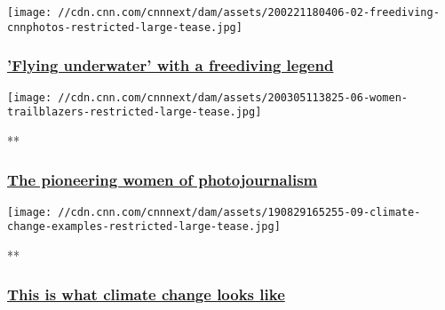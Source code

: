 \href{https://www.cnn.com/interactive/2020/02/world/freediving-guillaume-nery-cnnphotos/index.html}{}

\texttt{[image: //cdn.cnn.com/cnnnext/dam/assets/200221180406-02-freediving-cnnphotos-restricted-large-tease.jpg]}

\hypertarget{flying-underwater-with-a-freediving-legend}{%
\subsubsection{\texorpdfstring{\href{https://www.cnn.com/interactive/2020/02/world/freediving-guillaume-nery-cnnphotos/index.html}{'Flying
underwater' with a freediving
legend}}{'Flying underwater' with a freediving legend}}\label{flying-underwater-with-a-freediving-legend}}

\href{/2020/03/06/world/gallery/trailblazers-of-light-women-photojournalists/index.html}{}

\texttt{[image: //cdn.cnn.com/cnnnext/dam/assets/200305113825-06-women-trailblazers-restricted-large-tease.jpg]}

**

\hypertarget{the-pioneering-women-of-photojournalism}{%
\subsubsection{\texorpdfstring{\href{/2020/03/06/world/gallery/trailblazers-of-light-women-photojournalists/index.html}{The
pioneering women of
photojournalism}}{The pioneering women of photojournalism}}\label{the-pioneering-women-of-photojournalism}}

\href{/2019/08/30/weather/gallery/climate-change-global-wxc/index.html}{}

\texttt{[image: //cdn.cnn.com/cnnnext/dam/assets/190829165255-09-climate-change-examples-restricted-large-tease.jpg]}

**

\hypertarget{this-is-what-climate-change-looks-like}{%
\subsubsection{\texorpdfstring{\href{/2019/08/30/weather/gallery/climate-change-global-wxc/index.html}{This
is what climate change looks
like}}{This is what climate change looks like}}\label{this-is-what-climate-change-looks-like}}

\href{https://www.cnn.com/interactive/2019/07/opinions/rosem-morton-sexual-assault-cnnphotos/index.html}{}

